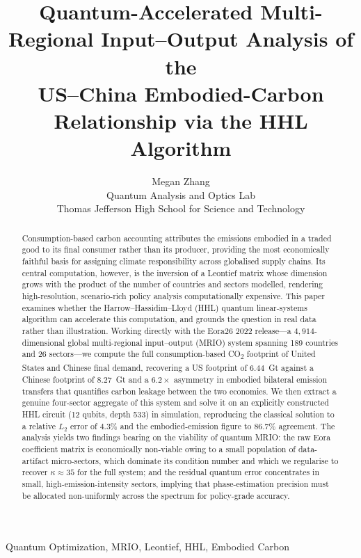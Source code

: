 \documentclass[letterpaper, 10 pt, conference]{ieeeconf}
\title{\LARGE \bf
Quantum-Accelerated Multi-Regional Input--Output Analysis of the\\
US--China Embodied-Carbon Relationship via the HHL Algorithm
}
\author{Megan Zhang%
\\ Quantum Analysis and Optics Lab \\
Thomas Jefferson High School for Science and Technology \\
}
\newcommand{\COO}{CO\textsubscript{2}}
\begin{document}
\maketitle
\thispagestyle{plain}
\pagestyle{plain}

\begin{abstract}

Consumption-based carbon accounting attributes the emissions embodied in a traded good to its final consumer rather than its producer, providing the most economically faithful basis for assigning climate responsibility across globalised supply chains. Its central computation, however, is the inversion of a Leontief matrix whose dimension grows with the product of the number of countries and sectors modelled, rendering high-resolution, scenario-rich policy analysis computationally expensive. This paper examines whether the Harrow--Hassidim--Lloyd (HHL) quantum linear-systems algorithm can accelerate this computation, and grounds the question in real data rather than illustration. Working directly with the Eora26 2022 release---a $4{,}914$-dimensional global multi-regional input--output (MRIO) system spanning 189 countries and 26 sectors---we compute the full consumption-based \COO{} footprint of United States and Chinese final demand, recovering a US footprint of $6.44$~Gt against a Chinese footprint of $8.27$~Gt and a $6.2\times$ asymmetry in embodied bilateral emission transfers that quantifies carbon leakage between the two economies. We then extract a genuine four-sector aggregate of this system and solve it on an explicitly constructed HHL circuit (12 qubits, depth 533) in simulation, reproducing the classical solution to a relative $L_2$ error of $4.3\%$ and the embodied-emission figure to $86.7\%$ agreement. The analysis yields two findings bearing on the viability of quantum MRIO: the raw Eora coefficient matrix is economically non-viable owing to a small population of data-artifact micro-sectors, which dominate its condition number and which we regularise to recover $\kappa\approx 35$ for the full system; and the residual quantum error concentrates in small, high-emission-intensity sectors, implying that phase-estimation precision must be allocated non-uniformly across the spectrum for policy-grade accuracy.

\end{abstract}

\begin{keywords}
Quantum Optimization, MRIO, Leontief, HHL, Embodied Carbon
\end{keywords}
\end{document}
